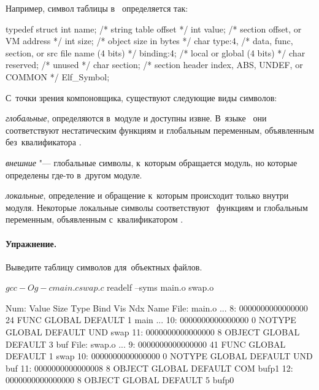 \noindent Например, символ таблицы в~ определяется так:
\begin{ccode}
typedef struct {
  int name;        /* string table offset */
  int value;       /* section offset, or VM address */
  int size;        /* object size in bytes */
  char type:4,     /* data, func, section, or src file name (4 bits) */
       binding:4;  /* local or global (4 bits) */
  char reserved;   /* unused */
  char section;    /* section header index, ABS, UNDEF, or COMMON */
} Elf_Symbol;
\end{ccode}

\noindent С~точки зрения компоновщика, существуют следующие виды символов:
\begin{itemfeature}
  \item \emph{глобальные}, определяются в~модуле и доступны извне. В~языке~ они соответствуют нестатическим функциям и глобальным переменным, объявленным без~квалификатора .

  \item \emph{внешние} "--- глобальные символы, к~которым обращается модуль, но которые определены где-то в~другом модуле.

  \item \emph{локальные}, определение и обращение к~которым происходит только внутри модуля. Некоторые локальные символы соответствуют~ функциям и глобальным переменным, объявленным с~квалификатором .
\end{itemfeature}



\paragraph{Упражнение.}
Выведите таблицу символов для~объектных файлов.

\begin{consolecode}
$ gcc -Og -c main.c swap.c
$ readelf --syms main.o swap.o
\end{consolecode}

\begin{textcode}
Num:    Value          Size Type    Bind   Vis      Ndx Name
File: main.o
...
  8: 0000000000000000    24 FUNC    GLOBAL DEFAULT    1 main
...
 10: 0000000000000000     0 NOTYPE  GLOBAL DEFAULT  UND swap
 11: 0000000000000000     8 OBJECT  GLOBAL DEFAULT    3 buf
File: swap.o
...
  9: 0000000000000000    41 FUNC    GLOBAL DEFAULT    1 swap
 10: 0000000000000000     0 NOTYPE  GLOBAL DEFAULT  UND buf
 11: 0000000000000008     8 OBJECT  GLOBAL DEFAULT  COM bufp1
 12: 0000000000000000     8 OBJECT  GLOBAL DEFAULT    5 bufp0
\end{textcode}

